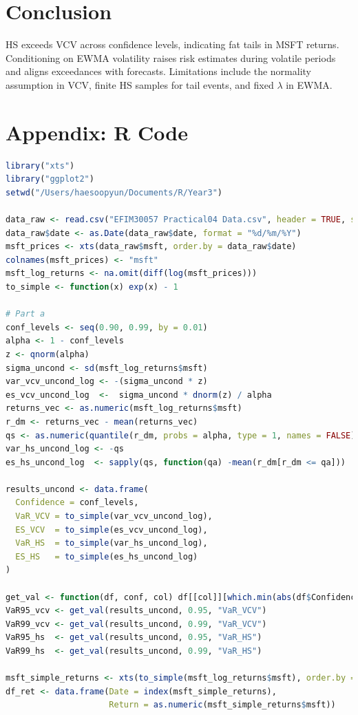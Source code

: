 \documentclass[11pt]{article}
\begin{document}
\section*{Conclusion}
HS exceeds VCV across confidence levels, indicating fat tails in MSFT returns. Conditioning on EWMA volatility raises risk estimates during volatile periods and aligns exceedances with forecasts. Limitations include the normality assumption in VCV, finite HS samples for tail events, and fixed $\lambda$ in EWMA.

\newpage
\section*{Appendix: R Code}
\begin{lstlisting}[language=R, caption={R code for VaR and ES estimation}]
library("xts")
library("ggplot2")
setwd("/Users/haesoopyun/Documents/R/Year3")

data_raw <- read.csv("EFIM30057 Practical04 Data.csv", header = TRUE, stringsAsFactors = FALSE)
data_raw$date <- as.Date(data_raw$date, format = "%d/%m/%Y")
msft_prices <- xts(data_raw$msft, order.by = data_raw$date)
colnames(msft_prices) <- "msft"
msft_log_returns <- na.omit(diff(log(msft_prices)))
to_simple <- function(x) exp(x) - 1

# Part a
conf_levels <- seq(0.90, 0.99, by = 0.01)
alpha <- 1 - conf_levels
z <- qnorm(alpha)
sigma_uncond <- sd(msft_log_returns$msft)
var_vcv_uncond_log <- -(sigma_uncond * z)
es_vcv_uncond_log  <-  sigma_uncond * dnorm(z) / alpha
returns_vec <- as.numeric(msft_log_returns$msft)
r_dm <- returns_vec - mean(returns_vec)
qs <- as.numeric(quantile(r_dm, probs = alpha, type = 1, names = FALSE))
var_hs_uncond_log <- -qs
es_hs_uncond_log  <- sapply(qs, function(qa) -mean(r_dm[r_dm <= qa]))

results_uncond <- data.frame(
  Confidence = conf_levels,
  VaR_VCV = to_simple(var_vcv_uncond_log),
  ES_VCV  = to_simple(es_vcv_uncond_log),
  VaR_HS  = to_simple(var_hs_uncond_log),
  ES_HS   = to_simple(es_hs_uncond_log)
)

get_val <- function(df, conf, col) df[[col]][which.min(abs(df$Confidence - conf))]
VaR95_vcv <- get_val(results_uncond, 0.95, "VaR_VCV")
VaR99_vcv <- get_val(results_uncond, 0.99, "VaR_VCV")
VaR95_hs  <- get_val(results_uncond, 0.95, "VaR_HS")
VaR99_hs  <- get_val(results_uncond, 0.99, "VaR_HS")

msft_simple_returns <- xts(to_simple(msft_log_returns$msft), order.by = index(msft_log_returns))
df_ret <- data.frame(Date = index(msft_simple_returns),
                     Return = as.numeric(msft_simple_returns$msft))


\end{lstlisting}
\end{document}
